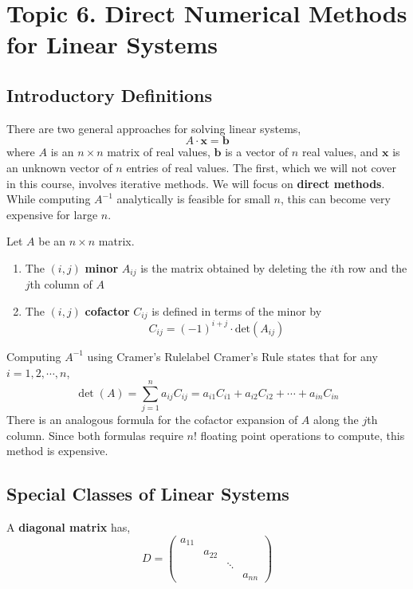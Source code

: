 \section{Topic 6. Direct Numerical Methods for Linear Systems}
\subsection{Introductory Definitions}
There are two general approaches for solving linear systems,
\[A \cdot \mathbf{x} = \mathbf{b}\]
where $A$ is an $n \times n$ matrix of real values, $\mathbf{b}$ is a vector of $n$ real values, and $\mathbf{x}$ is an unknown vector of $n$ entries of real values. The first, which we will not cover in this course, involves iterative methods. We will focus on \textbf{direct methods}. While computing $A^{-1}$ analytically is feasible for small $n$, this can become very expensive for large $n$.

\begin{defn}
	Let $A$ be an $n \times n$ matrix.
	\begin{enumerate}
		\item The $(i, j)$ \textbf{minor} $A_{ij}$ is the  matrix obtained by deleting the $i$th row and the $j$th column of $A$
		\item The $(i, j)$ \textbf{cofactor} $C_{ij}$ is defined in terms of the minor by
		\[C_{ij} = (-1)^{i+j} \cdot \text{det}(A_{ij})\]
	\end{enumerate}
\end{defn}

\begin{ex}{Computing $A^{-1}$ using Cramer's Rule}{label}
	Cramer's Rule states that for any $i = 1, 2, \cdots, n$,
	\[\operatorname{det}(A)=\sum_{j=1}^n a_{i j} C_{i j}=a_{i 1} C_{i 1}+a_{i 2} C_{i 2}+\cdots+a_{i n} C_{i n}\]
	There is an analogous formula for the cofactor expansion of $A$ along the $j$th column. Since both formulas require $n!$ floating point operations to compute, this method is expensive.
\end{ex}

\subsection{Special Classes of Linear Systems}
\begin{defn}
	A \textbf{diagonal matrix} has,
	\[D=\left(\begin{array}{llll}
	a_{11} & & & \\
	& a_{22} & & \\
	& & \ddots & \\
	& & & a_{n n}
	\end{array}\right)\]
\end{defn}

